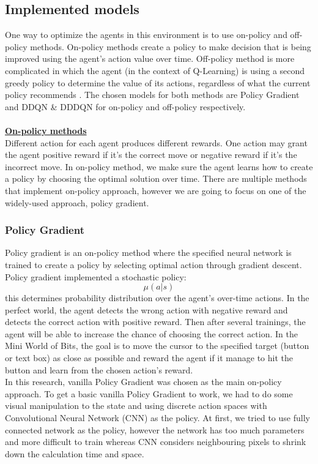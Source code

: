 \documentclass[conference]{IEEEtran}
\begin{document}
\subsection{Implemented models}
One way to optimize the agents in this environment is to use on-policy and off-policy methods. On-policy methods create a policy to make decision that is being improved using the agent’s action value over time. Off-policy method is more complicated in which the agent (in the context of Q-Learning) is using a second greedy policy to determine the value of its actions, regardless of what the current policy recommends \cite{sutton1998reinforcement}. The chosen models for both methods are Policy Gradient and DDQN \& DDDQN for on-policy and off-policy respectively. 
\\\\
\underline{\bf On-policy methods}  
\\
Different action for each agent produces different rewards. One action may grant the agent positive reward if it’s the correct move or negative reward if it’s the incorrect move. In on-policy method, we make sure the agent learns how to create a policy by choosing the optimal solution over time. There are multiple methods that implement on-policy approach, however we are going to focus on one of the widely-used approach, policy gradient.
\subsubsection{Policy Gradient}
Policy gradient is an on-policy method where the specified neural network is trained to create a policy by selecting optimal action through gradient descent. Policy gradient implemented a stochastic policy:
\[ \mu(a|s) \]
this determines probability distribution over the agent’s over-time actions. In the perfect world, the agent detects the wrong action with negative reward and detects the correct action with positive reward. Then after several trainings, the agent will be able to increase the chance of choosing the correct action. In the Mini World of Bits, the goal is to move the cursor to the specified target (button or text box) as close as possible and reward the agent if it manage to hit the button and learn from the chosen action’s reward. 
\\In this research, vanilla Policy Gradient was chosen as the main on-policy approach. To get a basic vanilla Policy Gradient to work, we had to do some visual manipulation to the state and using discrete action spaces with Convolutional Neural Network (CNN) as the policy. At first, we tried to use fully connected network as the policy, however the network has too much parameters and more difficult to train whereas CNN considers neighbouring pixels to shrink down the calculation time and space.
\end{document}

